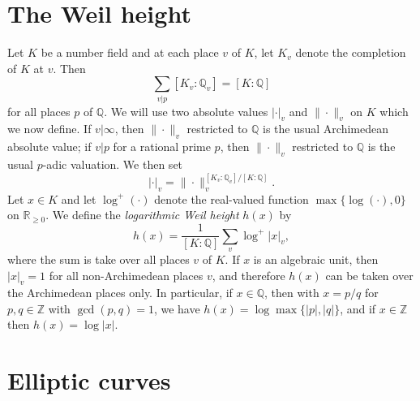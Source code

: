 \section{The Weil height}
\label{sec:WeilHeight}

Let $K$ be a number field and at each place $v$ of $K$, let $K_v$ denote the completion of $K$ at $v$. Then
\[\sum_{v|p} [K_v:\mathbb{Q}_v] = [K:\mathbb{Q}]\]
for all places $p$ of $\mathbb{Q}$. We will use two absolute values $| \cdot |_v$ and $\| \cdot \|_v$ on $K$ which we now define. If $v|\infty$, then $\| \cdot \|_v$ restricted to $\mathbb{Q}$ is the usual Archimedean absolute value; if $v|p$ for a rational prime $p$, then $\| \cdot \|_v$ restricted to $\mathbb{Q}$ is the usual $p$-adic valuation. We then set
\[ | \cdot |_v = \| \cdot \|_v^{[K_v:\mathbb{Q}_v]/[K:\mathbb{Q}]}.\]
Let $x \in K$ and let $\log^+(\cdot)$ denote the real-valued function $\max\{\log(\cdot),0\}$ on $\mathbb{R}_{\geq 0}$. We define the \textit{logarithmic Weil height} $h(x)$ by 
\[h(x) = \frac{1}{[K:\mathbb{Q}]}\sum_v \log^+|x|_v,\]
where the sum is take over all places $v$ of $K$. If $x$ is an algebraic unit, then $|x|_v = 1$ for all non-Archimedean places $v$, and therefore $h(x)$ can be taken over the Archimedean places only. 
In particular, if $x \in \mathbb{Q}$, then with $x = p/q$ for $p,q \in \mathbb{Z}$ with $\gcd(p,q) = 1$, we have $h(x) = \log\max\{|p|,|q|\}$, and if $x \in \mathbb{Z}$ then $h(x) = \log|x|$. 



\section{Elliptic curves}
\label{sec:EllipticCurves}

